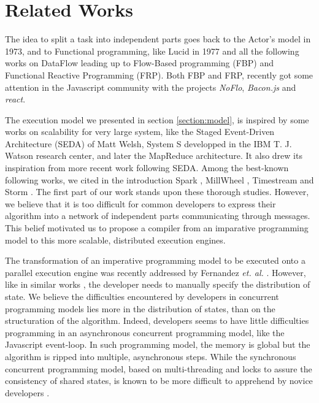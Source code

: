 \section{Related Works} \label{section:related}

The idea to split a task into independent parts goes back to the Actor's model\cite{Hewitt1973} in 1973, and to Functional programming, like Lucid\cite{Ashcroft1977} in 1977 and all the following works on DataFlow leading up to Flow-Based programming (FBP) and Functional Reactive Programming (FRP).
Both FBP and FRP, recently got some attention in the Javascript community with the projects \textit{NoFlo}, \textit{Bacon.js} and \textit{react}.

The execution model we presented in section \ref{section:model}, is inspired by some works on scalability for very large system, like the Staged Event-Driven Architecture (SEDA) of Matt Welsh\cite{Welsh2000}, System S developped in the IBM T. J. Watson research center\cite{Jain2006,Wu2007}, and later the MapReduce architecture\cite{Dean2008}.
It also drew its inspiration from more recent work following SEDA.
Among the best-known following works, we cited in the introduction Spark \cite{Zaharia2010, Zaharia2012}, MillWheel \cite{Akidau2013}, Timestream \cite{Qian2013} and Storm \cite{Toshniwal2014}.
The first part of our work stands upon these thorough studies.
However, we believe that it is too difficult for common developers to express their algorithm into a network of independent parts communicating through messages.
This belief motivated us to propose a compiler from an imparative programming model to this more scalable, distributed execution engines.


The transformation of an imperative programming model to be executed onto a parallel execution engine was recently addressed by Fernandez \textit{et. al.} \cite{Fernandez2014a}.
However, like in similar works \cite{Mitchell2012,Power2010}, the developer needs to manually specify the distribution of state.
We believe the difficulties encountered by developers in concurrent programming models lies more in the distribution of states, than on the structuration of the algorithm.
Indeed, developers seems to have little difficulties programming in an asynchronous concurrent programming model, like the Javascript event-loop.
In such programming model, the memory is global but the algorithm is ripped into multiple, asynchronous steps.
While the synchronous concurrent programming model, based on multi-threading and locks to assure the consistency of shared states, is known to be more difficult to apprehend by novice developers \cite{Adya2002}.


